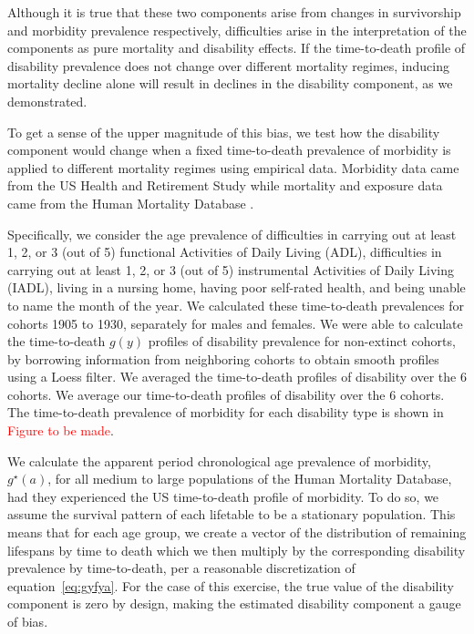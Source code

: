 \documentclass[11pt,oneside,a4paper]{article} %
\begin{document}
Although it is true that these two components arise from changes in survivorship
and morbidity prevalence respectively, difficulties arise in the interpretation
of the components as pure mortality and disability effects. If the time-to-death
profile of disability prevalence does not change over different mortality
regimes, inducing mortality decline alone will result in declines in the
disability component, as we demonstrated.

To get a sense of the upper magnitude of this bias, we test how the disability
component would change when a fixed time-to-death prevalence of morbidity is
applied to different mortality regimes using empirical data. Morbidity data came from the US Health and Retirement Study while mortality and exposure data came from the Human Mortality Database \citep{HMD2015}.

Specifically, we consider the age prevalence of difficulties in carrying out at
least 1, 2, or 3 (out of 5) functional Activities of Daily Living (ADL),
difficulties in carrying out at least 1, 2, or 3 (out of 5) instrumental
Activities of Daily Living (IADL), living in a nursing home, having poor
self-rated health, and being unable to name the month of the year. We calculated
these time-to-death prevalences for cohorts 1905 to 1930, separately for males
and females. We were able to calculate the time-to-death $g(y)$ profiles of
disability prevalence for non-extinct cohorts, by borrowing information from
neighboring cohorts to obtain smooth profiles using a Loess filter. We averaged
the time-to-death profiles of disability over the 6 cohorts. 
We average our time-to-death profiles of
disability over the 6 cohorts. The time-to-death prevalence of morbidity for
each disability type is shown in \textcolor{red}{Figure to be made}.

We calculate the apparent period chronological age prevalence of morbidity,
$g^\star(a)$, for all medium to large populations of the Human Mortality
Database, had they experienced the US time-to-death profile of morbidity. To
do so, we assume the survival pattern of each lifetable to be a stationary
population.
This means that for each age group, we create a vector of the distribution of
remaining lifespans by time to death which we then multiply by the corresponding
disability prevalence by time-to-death, per a reasonable
discretization of equation~\eqref{eq:gyfya}. For the case of this exercise, the
true value of the disability component is zero by design, making the estimated
disability component a gauge of bias.
\end{document}
